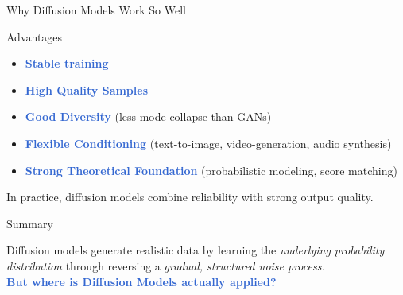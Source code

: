 \documentclass[handout, aspectratio=169,11pt]{beamer}
\newcommand{\emphasisword}[2]{\textcolor{#1}{\textbf{#2}}}
\newcommand{\highlight}[1]{\emphasisword{Highlight}{#1}}
\newcommand{\important}[1]{\emphasisword{Highlight}{#1}}
\begin{document}
\begin{frame}{Why Diffusion Models Work So Well}
  \begin{block}{Advantages}
    \begin{itemize}
      \item \important{Stable training}
      \pause
      \item \important{High Quality Samples}
      \pause
      \item \highlight{Good Diversity} {\small (less mode collapse than GANs)}
      \pause
      \item \highlight{Flexible Conditioning} {\small (text-to-image, video-generation, audio synthesis)}
      \pause
      \item \highlight{Strong Theoretical Foundation} {\small (probabilistic modeling, score matching)}
    \end{itemize}
  \end{block}
  \pause

  \vspace{6pt}
  \begin{center}
    {In practice, diffusion models combine reliability with strong output quality.}
  \end{center}
\end{frame}

\begin{frame}{Summary}
  \begin{center}
    \Large
    Diffusion models generate realistic data by learning the \textit{underlying probability distribution} through reversing a \textit{gradual, structured noise process.}\\[20pt]
    \pause
    {\setlength{\fboxsep}{8pt}\colorbox{BgElevated}{\Large \highlight{But where is Diffusion Models actually applied?}}}
  \end{center}
\end{frame}

\end{document}
